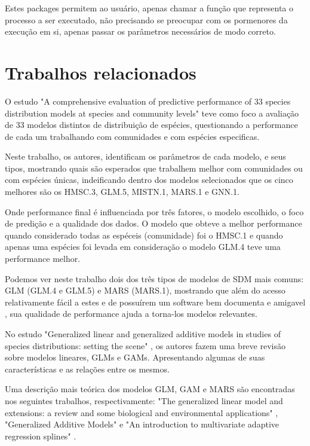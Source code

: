 \documentclass[
	12pt,				%
	openright,			%
	oneside,			%
	a4paper,			%
	english,			%
	brazil				%
	]{abntex2}
\begin{document}
Estes packages permitem ao usuário, apenas chamar a função que representa o processo a ser executado, não precisando se preocupar com
os pormenores da execução em si, apenas passar os parâmetros necessários de modo correto.

\section{Trabalhos relacionados}

O estudo "A comprehensive evaluation of predictive performance of 33 species distribution models at species and community levels"
\cite{predPerform33models} teve como foco a avaliação de 33 modelos distintos de distribuição de espécies, questionando a
performance de cada um trabalhando com comunidades e com espécies especificas.

Neste trabalho, os autores, identificam os parâmetros de cada modelo, e seus tipos, mostrando quais são esperados que trabalhem melhor
com comunidades ou com espécies únicas, indeificando dentro dos modelos selecionados que os cinco melhores são os HMSC.3, GLM.5,
MISTN.1, MARS.1 e GNN.1.

Onde performance final é influenciada por três fatores, o modelo escolhido, o foco de predição e a qualidade dos dados. O modelo
que obteve a melhor performance quando considerado todas as espéceis (comunidade) foi o HMSC.1 e quando apenas uma 
espécies foi levada em consideração o modelo GLM.4 teve uma performance melhor.

Podemos ver neste trabalho dois dos três tipos de modelos de SDM mais comuns: GLM (GLM.4 e GLM.5) e MARS (MARS.1), mostrando que
além do acesso relativamente fácil a estes e de possuírem um software bem documenta e amigavel \cite{predPerform33models}, sua 
qualidade de performance ajuda a torna-los modelos relevantes.

No estudo "Generalized linear and generalized additive models in studies of species distributions: setting the scene" 
\cite{GAMeGLM_especie_estudo}, os autores fazem uma breve revisão sobre modelos lineares, GLMs e GAMs. Apresentando algumas
de suas características e as relações entre os mesmos.

Uma descrição mais teórica dos modelos GLM, GAM e MARS são encontradas nos seguintes trabalhos, respectivamente: "The generalized 
linear model and extensions: a review and some biological and environmental applications" \cite{GLM}, "Generalized Additive Models"
\cite{GAM} e "An introduction to multivariate adaptive regression splines" \cite{MARS}.
\end{document}
